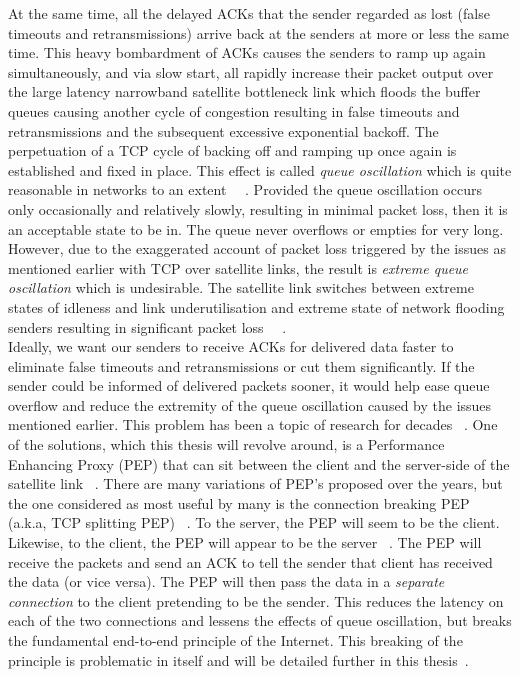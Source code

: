 At the same time, all the delayed ACKs that the sender regarded as lost (false timeouts and retransmissions) arrive back at the senders at more or less the same time. This heavy bombardment of ACKs causes the senders to ramp up again simultaneously, and via slow start, all rapidly increase their packet output over the large latency narrowband satellite bottleneck link which floods the buffer queues causing another cycle of congestion resulting in false timeouts and retransmissions and the subsequent excessive exponential backoff. The perpetuation of a TCP cycle of backing off and ramping up once again is established and fixed in place. This effect is called \emph{queue oscillation} which is quite reasonable in networks to an extent ~\cite{4}~\cite{5}. Provided the queue oscillation occurs only occasionally and relatively slowly, resulting in minimal packet loss, then it is an acceptable state to be in. The queue never overflows or empties for very long. However, due to the exaggerated account of packet loss triggered by the issues as mentioned earlier with TCP over satellite links, the result is \emph{extreme queue oscillation} which is undesirable. The satellite link switches between extreme states of idleness and link underutilisation and extreme state of network flooding senders resulting in significant packet loss ~\cite{4}~\cite{5}.\\


Ideally, we want our senders to receive ACKs for delivered data faster to eliminate false timeouts and retransmissions or cut them significantly. If the sender could be informed of delivered packets sooner, it would help ease queue overflow and reduce the extremity of the queue oscillation caused by the issues mentioned earlier. This problem has been a topic of research for decades ~\cite{16}. One of the solutions, which this thesis will revolve around, is a Performance Enhancing Proxy (PEP) that can sit between the client and the server-side of the satellite link ~\cite{6}. There are many variations of PEP's proposed over the years, but the one considered as most useful by many is the connection breaking PEP (a.k.a, TCP splitting PEP) ~\cite{14}. To the server, the PEP will seem to be the client. Likewise, to the client, the PEP will appear to be the server ~\cite{6}. The PEP will receive the packets and send an ACK to tell the sender that client has received the data (or vice versa). The PEP will then pass the data in a \emph{separate connection} to the client pretending to be the sender. This reduces the latency on each of the two connections and lessens the effects of queue oscillation, but breaks the fundamental end-to-end principle of the Internet. This breaking of the principle is problematic in itself and will be detailed further in this thesis~\cite{6}. \\

